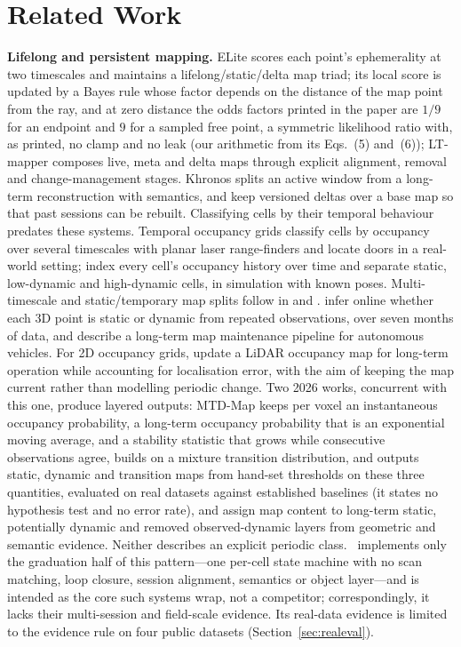 \section{Related Work}\label{sec:related}

\noindent\textbf{Lifelong and persistent mapping.} ELite \citep{gil2025elite} scores each point's ephemerality at two timescales and maintains a lifelong/static/delta map triad; its local score is updated by a Bayes rule whose factor depends on the distance of the map point from the ray, and at zero distance the odds factors printed in the paper are $1/9$ for an endpoint and $9$ for a sampled free point, a symmetric likelihood ratio with, as printed, no clamp and no leak (our arithmetic from its Eqs.~(5) and~(6)); LT-mapper \citep{kim2022ltmapper} composes live, meta and delta maps through explicit alignment, removal and change-management stages. Khronos \citep{schmid2024khronos} splits an active window from a long-term reconstruction with semantics, and \citet{yang2025lifelong3d} keep versioned deltas over a base map so that past sessions can be rebuilt. Classifying cells by their temporal behaviour predates these systems. Temporal occupancy grids \citep{arbuckle2002temporal} classify cells by occupancy over several timescales with planar laser range-finders and locate doors in a real-world setting; \citet{mitsou2007temporal} index every cell's occupancy history over time and separate static, low-dynamic and high-dynamic cells, in simulation with known poses. Multi-timescale and static/temporary map splits follow in \citet{biber2005dynamicmaps} and \citet{meyerdelius2010temporary}. \citet{pomerleau2014longterm} infer online whether each 3D point is static or dynamic from repeated observations, over seven months of data, and \citet{berrio2021longterm} describe a long-term map maintenance pipeline for autonomous vehicles. For 2D occupancy grids, \citet{stefanini2022efficient,stefanini2023safe} update a LiDAR occupancy map for long-term operation while accounting for localisation error, with the aim of keeping the map current rather than modelling periodic change. Two 2026 works, concurrent with this one, produce layered outputs: MTD-Map \citep{kim2026mtdmap} keeps per voxel an instantaneous occupancy probability, a long-term occupancy probability that is an exponential moving average, and a stability statistic that grows while consecutive observations agree, builds on a mixture transition distribution, and outputs static, dynamic and transition maps from hand-set thresholds on these three quantities, evaluated on real datasets against established baselines (it states no hypothesis test and no error rate), and \citet{chen2026layer} assign map content to long-term static, potentially dynamic and removed observed-dynamic layers from geometric and semantic evidence. Neither describes an explicit periodic class. \sname\ implements only the graduation half of this pattern---one per-cell state machine with no scan matching, loop closure, session alignment, semantics or object layer---and is intended as the core such systems wrap, not a competitor; correspondingly, it lacks their multi-session and field-scale evidence. Its real-data evidence is limited to the evidence rule on four public datasets (Section~\ref{sec:realeval}).

